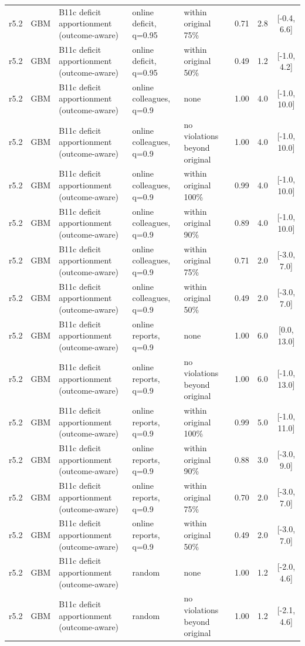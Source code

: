 \documentclass[10pt,onecolumn,letterpaper]{article}
\begin{document}
\begin{longtable}{lllp{4.2cm}p{3.4cm}ccc}
r5.2 & GBM & B11c deficit apportionment (outcome-aware) & online deficit, q=0.95 & within original 75\% & 0.71 & 2.8 & [-0.4, 6.6] \\
r5.2 & GBM & B11c deficit apportionment (outcome-aware) & online deficit, q=0.95 & within original 50\% & 0.49 & 1.2 & [-1.0, 4.2] \\
r5.2 & GBM & B11c deficit apportionment (outcome-aware) & online colleagues, q=0.9 & none & 1.00 & 4.0 & [-1.0, 10.0] \\
r5.2 & GBM & B11c deficit apportionment (outcome-aware) & online colleagues, q=0.9 & no violations beyond original & 1.00 & 4.0 & [-1.0, 10.0] \\
r5.2 & GBM & B11c deficit apportionment (outcome-aware) & online colleagues, q=0.9 & within original 100\% & 0.99 & 4.0 & [-1.0, 10.0] \\
r5.2 & GBM & B11c deficit apportionment (outcome-aware) & online colleagues, q=0.9 & within original 90\% & 0.89 & 4.0 & [-1.0, 10.0] \\
r5.2 & GBM & B11c deficit apportionment (outcome-aware) & online colleagues, q=0.9 & within original 75\% & 0.71 & 2.0 & [-3.0, 7.0] \\
r5.2 & GBM & B11c deficit apportionment (outcome-aware) & online colleagues, q=0.9 & within original 50\% & 0.49 & 2.0 & [-3.0, 7.0] \\
r5.2 & GBM & B11c deficit apportionment (outcome-aware) & online reports, q=0.9 & none & 1.00 & 6.0 & [0.0, 13.0] \\
r5.2 & GBM & B11c deficit apportionment (outcome-aware) & online reports, q=0.9 & no violations beyond original & 1.00 & 6.0 & [-1.0, 13.0] \\
r5.2 & GBM & B11c deficit apportionment (outcome-aware) & online reports, q=0.9 & within original 100\% & 0.99 & 5.0 & [-1.0, 11.0] \\
r5.2 & GBM & B11c deficit apportionment (outcome-aware) & online reports, q=0.9 & within original 90\% & 0.88 & 3.0 & [-3.0, 9.0] \\
r5.2 & GBM & B11c deficit apportionment (outcome-aware) & online reports, q=0.9 & within original 75\% & 0.70 & 2.0 & [-3.0, 7.0] \\
r5.2 & GBM & B11c deficit apportionment (outcome-aware) & online reports, q=0.9 & within original 50\% & 0.49 & 2.0 & [-3.0, 7.0] \\
r5.2 & GBM & B11c deficit apportionment (outcome-aware) & random & none & 1.00 & 1.2 & [-2.0, 4.6] \\
r5.2 & GBM & B11c deficit apportionment (outcome-aware) & random & no violations beyond original & 1.00 & 1.2 & [-2.1, 4.6] \\

\end{longtable}
\end{document}
